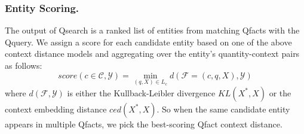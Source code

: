 \subsubsection{Entity Scoring.} The output of Qsearch is a ranked list of entities from matching Qfacts with the Qquery. 
We assign a score for each candidate entity 
based on one of the above context distance models and
aggregating over the entity's quantity-context pairs as follows:
\[\textit{score}(c \in \mathcal{C}, \mathcal{Y}) = \min\limits_{(q, X) \in L_c} d(\mathcal{F}=(c,q,X), \mathcal{Y})\]
where $d(\mathcal{F}, \mathcal{Y})$ is either the Kullback-Leibler divergence $\textit{KL}(X^*, X)$ or the context embedding distance
$ced(X^*,X)$.
So when the same candidate entity appears in multiple Qfacts, we pick the best-scoring
Qfact context distance.

